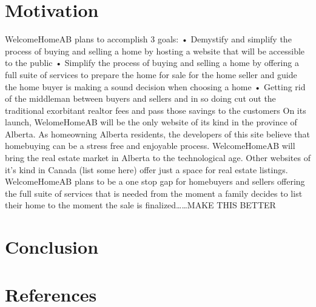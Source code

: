 \documentclass[letterpaper,12pt]{article}
\begin{document}
\section{Motivation}

WelcomeHomeAB plans to accomplish 3 goals: 
•	Demystify and simplify the process of buying and selling a home by hosting a website that will be accessible to the public
•	Simplify the process of buying and selling a home by offering a full suite of services to prepare the home for sale for the home seller and guide the home buyer is making a sound decision when choosing a home
•	Getting rid of the middleman between buyers and sellers and in so doing cut out the traditional exorbitant realtor fees and pass those savings to the customers
On its launch, WelomeHomeAB will be the only website of its kind in the province of Alberta. As homeowning Alberta residents, the developers of this site believe that homebuying can be a stress free and enjoyable process. WelcomeHomeAB will bring the real estate market in Alberta to the technological age.
Other websites of it’s kind in Canada (list some here) offer just a space for real estate listings. WelcomeHomeAB plans to be a one stop gap for homebuyers and sellers offering the full suite of services that is needed from the moment a family decides to list their home to the moment the sale is finalized……MAKE THIS BETTER


\section{Conclusion}

\section{References}
\end{document}
